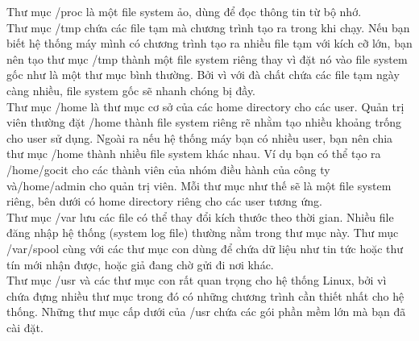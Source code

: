\documentclass[twoside]{article}
\begin{document}
Thư mục /proc là một file system ảo, dùng để đọc thông tin từ bộ nhớ.\\

Thư mục /tmp chứa các file tạm mà chương trình tạo ra trong khi chạy. Nếu bạn biết hệ thống máy mình có chương trình tạo ra nhiều file tạm với kích cỡ lớn, bạn nên tạo thư mục /tmp thành một file system riêng thay vì đặt nó vào file system gốc như là một thư mục bình thường. Bởi vì với đà chất chứa các file tạm ngày càng nhiều, file system gốc sẽ nhanh chóng bị đầy. \\

Thư mục /home là thư mục cơ sở của các home directory cho các user. Quản trị viên thường đặt /home thành file system riêng rẽ nhằm tạo nhiều khoảng trống cho user sử dụng. Ngoài ra nếu hệ thống máy bạn có nhiều user, bạn nên chia thư mục /home thành nhiều file system khác nhau. Ví dụ bạn có thể tạo ra /home/gocit cho các thành viên của nhóm điều hành của công ty và/home/admin cho quản trị viên. Mỗi thư mục như thế sẽ là một file system riêng, bên dưới có home directory riêng cho các user tương ứng.\\

Thư mục /var lưu các file có thể thay đổi kích thước theo thời gian. Nhiều file đăng nhập hệ thống (system log file) thường nằm trong thư mục này. Thư mục /var/spool cùng với các thư mục con dùng để chứa dữ liệu như tin tức hoặc thư tín mới nhận được, hoặc giả đang chờ gửi đi nơi khác. \\

Thư mục /usr và các thư mục con rất quan trọng cho hệ thống Linux, bởi vì chứa đựng nhiều thư mục trong đó có những chương trình cần thiết nhất cho hệ thống. Những thư mục cấp dưới của /usr chứa các gói phần mềm lớn mà bạn đã cài đặt. \\
\end{document}
